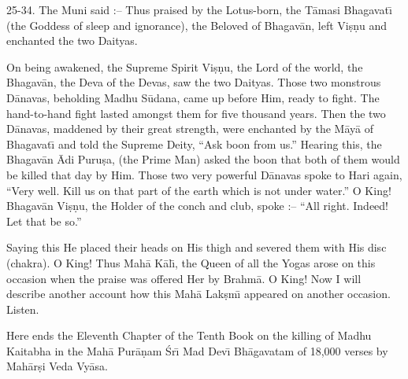 25-34. The Muni said :-- Thus praised by the Lotus-born, the T\=amasi Bhagavat\={\i} (the Goddess of sleep and ignorance), the Beloved of Bhagav\=an, left Vi\d{s}\d{n}u and enchanted the two Daityas.

On being awakened, the Supreme Spirit Vi\d{s}\d{n}u, the Lord of the world, the Bhagav\=an, the Deva of the Devas, saw the two Daityas. Those two monstrous D\=anavas, beholding Madhu S\=udana, came up before Him, ready to fight. The hand-to-hand fight lasted amongst them for five thousand years. Then the two D\=anavas, maddened by their great strength, were enchanted by the M\=ay\=a of Bhagavat\={\i} and told the Supreme Deity, ``Ask boon from us.'' Hearing this, the Bhagav\=an \=Adi Puru\d{s}a, (the Prime Man) asked the boon that both of them would be killed that day by Him. Those two very powerful D\=anavas spoke to Hari again, ``Very well. Kill us on that part of the earth which is not under water.'' O King! Bhagav\=an Vi\d{s}\d{n}u, the Holder of the conch and club, spoke :-- ``All right. Indeed! Let that be so.''

Saying this He placed their heads on His thigh and severed them with His disc (chakra). O King! Thus Mah\=a K\=al\={\i}, the Queen of all the Yogas arose on this occasion when the praise was offered Her by Brahm\=a. O King! Now I will describe another account how this Mah\=a Lak\d{s}m\={\i} appeared on another occasion. Listen.

Here ends the Eleventh Chapter of the Tenth Book on the killing of Madhu Kaitabha in the Mah\=a Pur\=a\d{n}am \'Sr\={\i} Mad Dev\={\i} Bh\=agavatam of 18,000 verses by Mah\=ar\d{s}i Veda Vy\=asa.



